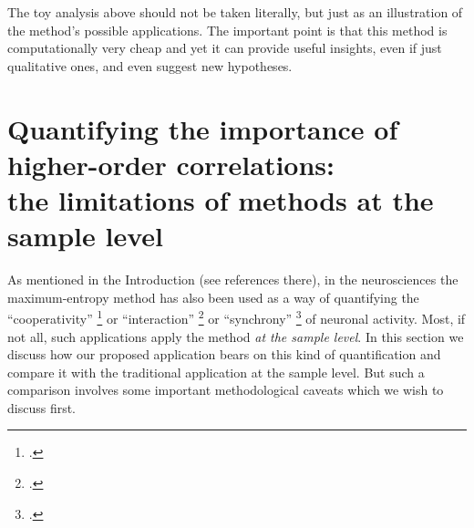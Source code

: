 \documentclass[\ifafour a4paper,12pt,\else a5paper,10pt,\fi%
onecolumn,oneside,article,%
british%
]{memoir}
\theoremstyle{remark}
\theoremstyle{innote}
\newcommand*{\citep}{\footcites}
\renewcommand*{\|}{\nonscript\,\vert\nonscript\;\mathopen{}}
\newcommand*{\eg}{{e.g.}}
\begin{document}
\medskip

The toy analysis above should not be taken literally, but just as an
illustration of the method's possible applications. The important point is
that this method is computationally very cheap and yet it can provide
useful insights, even if just qualitative ones, and even suggest new
hypotheses.




\section{Quantifying the importance of higher-order correlations:\\
  the limitations of methods at the sample level}
\label{sec:marginalization}

As mentioned in the Introduction (see references there), in the
neurosciences the maximum-entropy method has also been used as a way of
quantifying the \enquote{cooperativity} \citep[\eg][]{gersteinetal1985} or
\enquote{interaction}
\citep[\eg][]{martignonetal1995,schneidmanetal2006,shlensetal2006} or
\enquote{synchrony} \citep[\eg][-- we're only citing early papers using
these terms]{bohteetal2000,amarietal2003} of neuronal activity. Most, if
not all, such applications apply the method \emph{at the sample level}. In
this section we discuss how our proposed application bears on this kind of
quantification and compare it with the traditional application at the
sample level. But such a comparison involves some important methodological
caveats which we wish to discuss first.%

\bigskip
\end{document}
